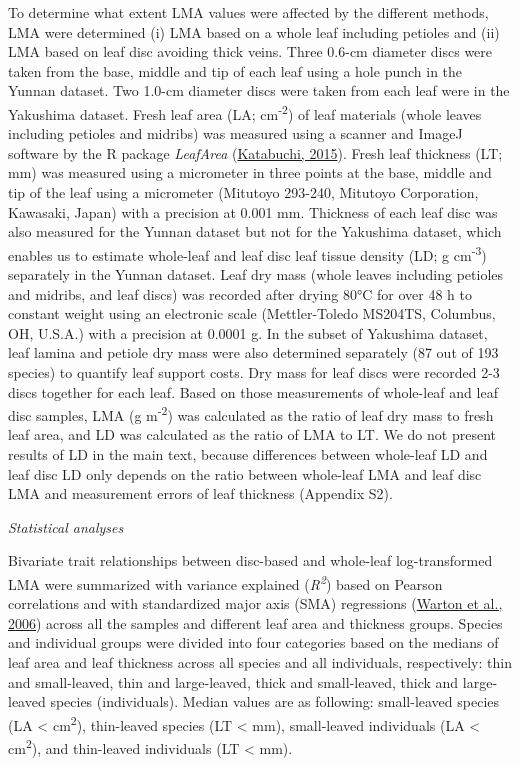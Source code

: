 \documentclass[
  12pt,
  a4paper,
,tablecaptionabove
]{scrartcl}
\begin{document}
To determine what extent LMA values were affected by the different
methods, LMA were determined (i) LMA based on a whole leaf including
petioles and (ii) LMA based on leaf disc avoiding thick veins. Three
0.6-cm diameter discs were taken from the base, middle and tip of each
leaf using a hole punch in the Yunnan dataset. Two 1.0-cm diameter discs
were taken from each leaf were in the Yakushima dataset. Fresh leaf area
(LA; cm\textsuperscript{-2}) of leaf materials (whole leaves including
petioles and midribs) was measured using a scanner and ImageJ software
by the R package \emph{LeafArea}
(\protect\hyperlink{ref-Katabuchi2015}{Katabuchi, 2015}). Fresh leaf
thickness (LT; mm) was measured using a micrometer in three points at
the base, middle and tip of the leaf using a micrometer (Mitutoyo
293-240, Mitutoyo Corporation, Kawasaki, Japan) with a precision at
0.001 mm. Thickness of each leaf disc was also measured for the Yunnan
dataset but not for the Yakushima dataset, which enables us to estimate
whole-leaf and leaf disc leaf tissue density (LD; g
cm\textsuperscript{-3}) separately in the Yunnan dataset. Leaf dry mass
(whole leaves including petioles and midribs, and leaf discs) was
recorded after drying 80°C for over 48 h to constant weight using an
electronic scale (Mettler-Toledo MS204TS, Columbus, OH, U.S.A.) with a
precision at 0.0001 g. In the subset of Yakushima dataset, leaf lamina
and petiole dry mass were also determined separately (87 out of 193
species) to quantify leaf support costs. Dry mass for leaf discs were
recorded 2-3 discs together for each leaf. Based on those measurements
of whole-leaf and leaf disc samples, LMA (g m\textsuperscript{-2}) was
calculated as the ratio of leaf dry mass to fresh leaf area, and LD was
calculated as the ratio of LMA to LT. We do not present results of LD in
the main text, because differences between whole-leaf LD and leaf disc
LD only depends on the ratio between whole-leaf LMA and leaf disc LMA
and measurement errors of leaf thickness (Appendix S2).

\emph{Statistical analyses}

Bivariate trait relationships between disc-based and whole-leaf
log-transformed LMA were summarized with variance explained
(\emph{R\textsuperscript{2}}) based on Pearson correlations and with
standardized major axis (SMA) regressions
(\protect\hyperlink{ref-Warton2006}{Warton et al., 2006}) across all the
samples and different leaf area and thickness groups. Species and
individual groups were divided into four categories based on the medians
of leaf area and leaf thickness across all species and all individuals,
respectively: thin and small-leaved, thin and large-leaved, thick and
small-leaved, thick and large-leaved species (individuals). Median
values are as following: small-leaved species (LA \textless{}
cm\textsuperscript{2}), thin-leaved species (LT \textless{} mm),
small-leaved individuals (LA \textless{} cm\textsuperscript{2}), and
thin-leaved individuals (LT \textless{} mm).
\end{document}
